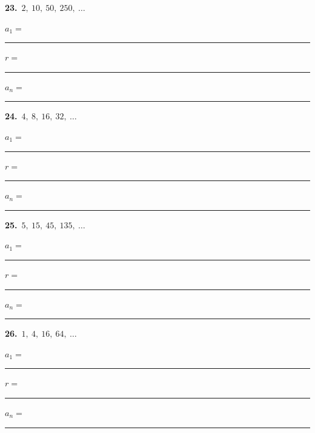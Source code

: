 \documentclass[11pt,letterpaper]{article}
\begin{document}
\needspace{2.0cm}\par\vspace{3mm}\noindent\begin{minipage}[t]{0.48\linewidth}{\color{fmturn}\bfseries 23.}\ $2,\ 10,\ 50,\ 250,\ \ldots$\par\vspace{2mm}\hspace*{4mm}$a_1=$\,\rule{1.2cm}{0.4pt}\quad $r=$\,\rule{1.2cm}{0.4pt}\par\vspace{2.5mm}\hspace*{4mm}$a_n=$\,\rule{3.6cm}{0.4pt}\end{minipage}\hfill\begin{minipage}[t]{0.48\linewidth}{\color{fmturn}\bfseries 24.}\ $4,\ 8,\ 16,\ 32,\ \ldots$\par\vspace{2mm}\hspace*{4mm}$a_1=$\,\rule{1.2cm}{0.4pt}\quad $r=$\,\rule{1.2cm}{0.4pt}\par\vspace{2.5mm}\hspace*{4mm}$a_n=$\,\rule{3.6cm}{0.4pt}\end{minipage}\par\vspace{1.0cm}
\needspace{2.0cm}\par\vspace{3mm}\noindent\begin{minipage}[t]{0.48\linewidth}{\color{fmturn}\bfseries 25.}\ $5,\ 15,\ 45,\ 135,\ \ldots$\par\vspace{2mm}\hspace*{4mm}$a_1=$\,\rule{1.2cm}{0.4pt}\quad $r=$\,\rule{1.2cm}{0.4pt}\par\vspace{2.5mm}\hspace*{4mm}$a_n=$\,\rule{3.6cm}{0.4pt}\end{minipage}\hfill\begin{minipage}[t]{0.48\linewidth}{\color{fmturn}\bfseries 26.}\ $1,\ 4,\ 16,\ 64,\ \ldots$\par\vspace{2mm}\hspace*{4mm}$a_1=$\,\rule{1.2cm}{0.4pt}\quad $r=$\,\rule{1.2cm}{0.4pt}\par\vspace{2.5mm}\hspace*{4mm}$a_n=$\,\rule{3.6cm}{0.4pt}\end{minipage}\par\vspace{1.0cm}
\end{document}
